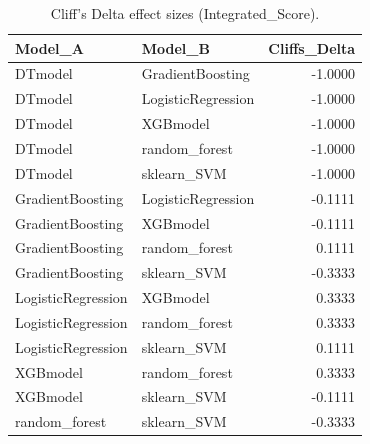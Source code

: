 \begin{table}[t]
\centering
\begin{tabular}{llr}
\toprule
Model_A & Model_B & Cliffs_Delta \\
\midrule
DTmodel & GradientBoosting & -1.0000 \\
DTmodel & LogisticRegression & -1.0000 \\
DTmodel & XGBmodel & -1.0000 \\
DTmodel & random_forest & -1.0000 \\
DTmodel & sklearn_SVM & -1.0000 \\
GradientBoosting & LogisticRegression & -0.1111 \\
GradientBoosting & XGBmodel & -0.1111 \\
GradientBoosting & random_forest & 0.1111 \\
GradientBoosting & sklearn_SVM & -0.3333 \\
LogisticRegression & XGBmodel & 0.3333 \\
LogisticRegression & random_forest & 0.3333 \\
LogisticRegression & sklearn_SVM & 0.1111 \\
XGBmodel & random_forest & 0.3333 \\
XGBmodel & sklearn_SVM & -0.1111 \\
random_forest & sklearn_SVM & -0.3333 \\
\bottomrule
\end{tabular}
\caption{Cliff's Delta effect sizes (Integrated_Score).}
\label{tab:cliffs_Integrated_Score}
\end{table}